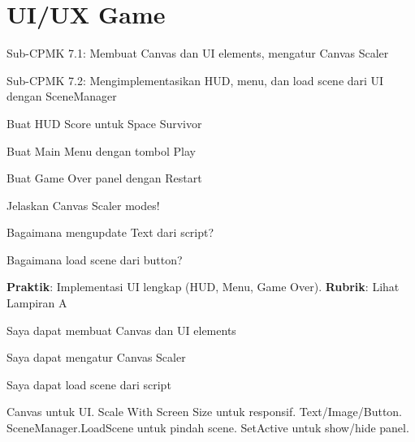 \documentclass[../main]{subfiles}
\begin{document}
\chapter{UI/UX Game}

\begin{subcpmk}
  \item Sub-CPMK 7.1: Membuat Canvas dan UI elements, mengatur Canvas Scaler
  \item Sub-CPMK 7.2: Mengimplementasikan HUD, menu, dan load scene dari UI dengan SceneManager
\end{subcpmk}




\begin{aktivitas}
  \item Buat HUD Score untuk Space Survivor
  \item Buat Main Menu dengan tombol Play
  \item Buat Game Over panel dengan Restart
\end{aktivitas}

\begin{latihan}
  \item Jelaskan Canvas Scaler modes!
  \item Bagaimana mengupdate Text dari script?
  \item Bagaimana load scene dari button?
\end{latihan}

\begin{asesmen}
\textbf{Praktik}: Implementasi UI lengkap (HUD, Menu, Game Over).
\textbf{Rubrik}: Lihat Lampiran A
\end{asesmen}

\begin{checklist}
  \item Saya dapat membuat Canvas dan UI elements
  \item Saya dapat mengatur Canvas Scaler
  \item Saya dapat load scene dari script
\end{checklist}

\begin{rangkuman}
Canvas untuk UI. Scale With Screen Size untuk responsif. Text/Image/Button. SceneManager.LoadScene untuk pindah scene. SetActive untuk show/hide panel.
\end{rangkuman}

\ifSubfilesClassLoaded{
  \renewcommand{\bibname}{Daftar Pustaka}
  
  
}{}
\end{document}

